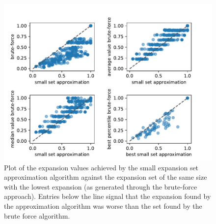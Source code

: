 \begin{figure}
	\centering
	\includegraphics[scale=1]{figures/quality_evaluation_log_expansion_values_for_same_number_verticies.pdf}
	\caption[Plot expansions approximation vs brute force]{Plot of the expansion values achieved by the small expansion set approximation algorithm against the expansion set of the same size with the lowest expansion (as generated through the brute-force approach).  Entries below the line signal that the expansion found by the approximation algorithm was worse than the set found by the brute force algorithm. \label{fig:expansion_approx_vs_brute}}
\end{figure}




